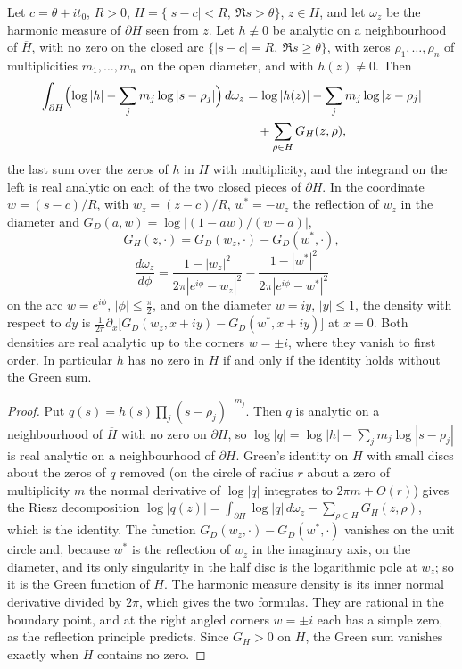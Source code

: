 \begin{theorem}\label{bsy:thm:halfdisk}
Let $c=\theta+it_0$, $R>0$, $H=\{|s-c|<R,\ \Re s>\theta\}$, $z\in H$, and let $\omega_z$ be the harmonic measure of $\partial H$ seen from $z$. Let $h\not\equiv0$ be analytic on a neighbourhood of $\overline H$, with no zero on the closed arc $\{|s-c|=R,\ \Re s\ge\theta\}$, with zeros $\rho_1,\dots,\rho_n$ of multiplicities $m_1,\dots,m_n$ on the open diameter, and with $h(z)\ne0$. Then
\[
\begin{aligned}
\int_{\partial H}\Bigl(\log|h|-\sum_jm_j\log|s-\rho_j|\Bigr)\,d\omega_z
&=\log|h(z)|-\sum_jm_j\log|z-\rho_j|\\&\quad+\sum_{\rho\in H}G_H(z,\rho),
\end{aligned}
\]
the last sum over the zeros of $h$ in $H$ with multiplicity, and the integrand on the left is real analytic on each of the two closed pieces of $\partial H$. In the coordinate $w=(s-c)/R$, with $w_z=(z-c)/R$, $w^*=-\overline{w_z}$ the reflection of $w_z$ in the diameter and $G_D(a,w)=\log|(1-\bar aw)/(w-a)|$,
\[
G_H(z,\cdot)=G_D(w_z,\cdot)-G_D(w^*,\cdot),\]\[
\frac{d\omega_z}{d\phi}=\frac{1-|w_z|^2}{2\pi|e^{i\phi}-w_z|^2}-\frac{1-|w^*|^2}{2\pi|e^{i\phi}-w^*|^2}
\]
on the arc $w=e^{i\phi}$, $|\phi|\le\frac\pi2$, and on the diameter $w=iy$, $|y|\le1$, the density with respect to $dy$ is $\frac1{2\pi}\partial_x\bigl[G_D(w_z,x+iy)-G_D(w^*,x+iy)\bigr]$ at $x=0$. Both densities are real analytic up to the corners $w=\pm i$, where they vanish to first order. In particular $h$ has no zero in $H$ if and only if the identity holds without the Green sum.
\end{theorem}

\begin{proof}
Put $q(s)=h(s)\prod_j(s-\rho_j)^{-m_j}$. Then $q$ is analytic on a neighbourhood of $\overline H$ with no zero on $\partial H$, so $\log|q|=\log|h|-\sum_jm_j\log|s-\rho_j|$ is real analytic on a neighbourhood of $\partial H$. Green's identity on $H$ with small discs about the zeros of $q$ removed (on the circle of radius $r$ about a zero of multiplicity $m$ the normal derivative of $\log|q|$ integrates to $2\pi m+O(r)$) gives the Riesz decomposition $\log|q(z)|=\int_{\partial H}\log|q|\,d\omega_z-\sum_{\rho\in H}G_H(z,\rho)$, which is the identity. The function $G_D(w_z,\cdot)-G_D(w^*,\cdot)$ vanishes on the unit circle and, because $w^*$ is the reflection of $w_z$ in the imaginary axis, on the diameter, and its only singularity in the half disc is the logarithmic pole at $w_z$; so it is the Green function of $H$. The harmonic measure density is its inner normal derivative divided by $2\pi$, which gives the two formulas. They are rational in the boundary point, and at the right angled corners $w=\pm i$ each has a simple zero, as the reflection principle predicts. Since $G_H>0$ on $H$, the Green sum vanishes exactly when $H$ contains no zero.
\end{proof}

